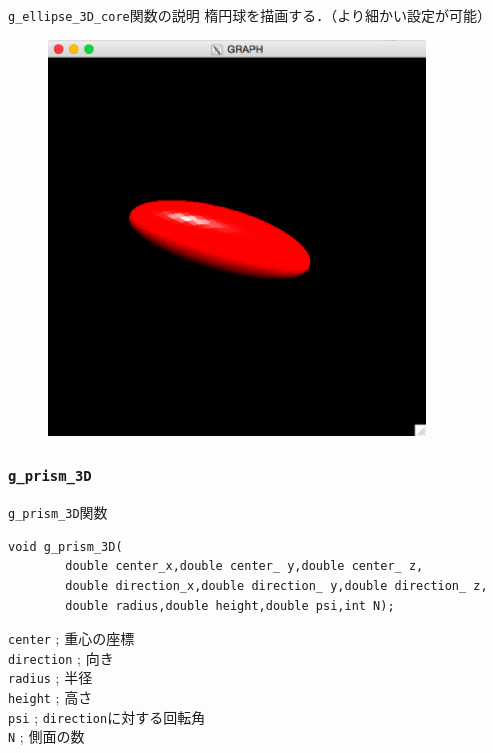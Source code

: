 \documentclass[a4paper,12pt]{jsarticle}%
\begin{document}
\begin{itembox}[l]{\texttt{g\_ellipse\_3D\_core}関数の説明}
楕円球を描画する．（より細かい設定が可能）
\end{itembox}

\begin{figure}[htb]
	\includegraphics[width=100mm]{./Figures/eps/Canvas_g_ellipse.eps}
\end{figure}



\clearpage
\subsubsection{\texttt{g\_prism\_3D}}

\begin{itembox}[l]{\texttt{g\_prism\_3D}関数}
\begin{verbatim}
void g_prism_3D(
        double center_x,double center_ y,double center_ z,
        double direction_x,double direction_ y,double direction_ z,
        double radius,double height,double psi,int N);
\end{verbatim}
\verb|center| ; 重心の座標\\
\verb|direction| ; 向き\\
\verb|radius| ; 半径\\
\verb|height| ; 高さ\\
\verb|psi| ; \verb|direction|に対する回転角\\
\verb|N| ; 側面の数\\
\end{itembox}
\end{document}
